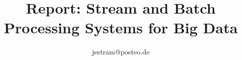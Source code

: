 \documentclass[conference]{IEEEtran}
\begin{document}
  \title{Report: Stream and Batch Processing Systems for Big Data\\}

  \author{
  jestram@posteo.de}

  \maketitle

  
  
  
  
   
  
  

  
  
\end{document}
